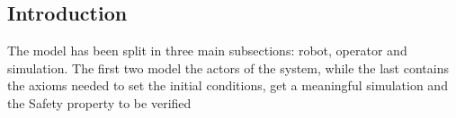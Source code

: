 \subsection{Introduction}
The model has been split in three main subsections: robot, operator and simulation. The first two model the actors of the system, while the last contains the axioms needed to set the initial conditions, get a meaningful simulation and the Safety property to be verified
